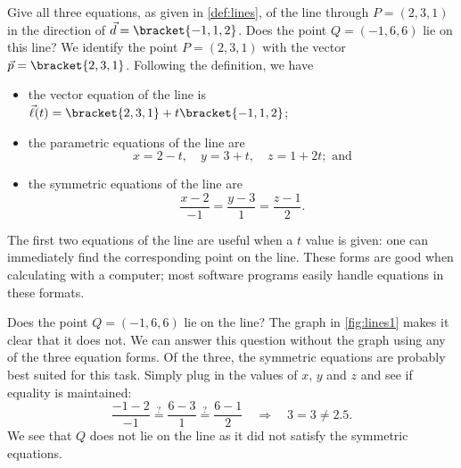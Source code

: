 \begin{example}\label{ex_lines1}
Give all three equations, as given in \autoref{def:lines}, of the line through $P = (2,3,1)$ in the direction of $\vec d =\bracket{-1,1,2}$. Does the point $Q=(-1,6,6)$ lie on this line?
\solution
We identify the point $P=(2,3,1)$ with the vector $\vec p =\bracket{2,3,1}$. Following the definition, we have
\begin{itemize}
	\item the vector equation of the line is $\vec\ell(t) =\bracket{2,3,1}+ t\bracket{-1,1,2}$;
	\item	the parametric equations of the line are
	\[x = 2-t,\quad y = 3+t,\quad z = 1+2t; \text{ and}\]
	\item	the symmetric equations of the line are
	\[\frac{x-2}{-1}=\frac{y-3}{1} = \frac{z-1}{2}.\]
\end{itemize}

The first two equations of the line are useful when a $t$ value is given: one can immediately find the corresponding point on the line. These forms are good when calculating with a computer; most software programs easily handle equations in these formats.


Does the point $Q = (-1,6,6)$ lie on the line? The graph in \autoref{fig:lines1} makes it clear that it does not. We can answer this question without the graph using any of the three equation forms. Of the three, the symmetric equations are probably best suited for this task. Simply plug in the values of $x$, $y$ and $z$ and see if equality is maintained:
\[
\frac{-1-2}{-1} \stackrel{?}{=} \frac{6-3}{1} \stackrel{?}{=} \frac{6-1}{2}
\quad \Rightarrow \quad 3=3\neq2.5.
\]
We see that $Q$ does not lie on the line as it did not satisfy the symmetric equations.
\end{example}

